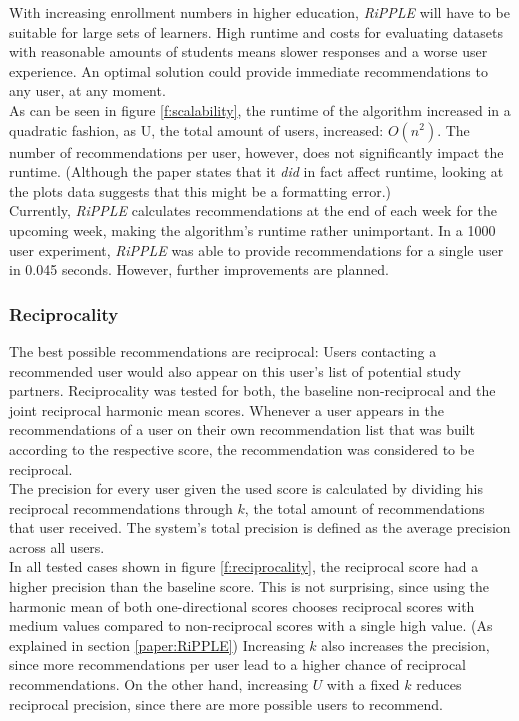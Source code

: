 \documentclass[conference]{IEEEtran}
\begin{document}
With increasing enrollment numbers in higher education, \textit{RiPPLE} will have to be suitable for large sets of learners. High runtime and costs for evaluating datasets with reasonable amounts of students means slower responses and a worse user experience. An optimal solution could provide immediate recommendations to any user, at any moment.\\
As can be seen in figure \ref{f:scalability}, the runtime of the algorithm increased in a quadratic fashion, as U, the total amount of users, increased: \(O(n^2)\). The number of recommendations per user, however, does not significantly impact the runtime. (Although the paper states that it \textit{did} in fact affect runtime, looking at the plots data suggests that this might be a formatting error.)\\
Currently, \textit{RiPPLE} calculates recommendations at the end of each week for the upcoming week, making the algorithm's runtime rather unimportant. In a 1000 user experiment, \textit{RiPPLE} was able to provide recommendations for a single user in 0.045 seconds. However, further improvements are planned.\\




\subsubsection{Reciprocality} \label{paper:reciprocality}
The best possible recommendations are reciprocal: Users contacting a recommended user would also appear on this user's list of potential study partners. \cite{prabhakar2017reciprocal} Reciprocality was tested for both, the baseline non-reciprocal and the joint reciprocal harmonic mean scores. Whenever a user appears in the recommendations of a user on their own recommendation list that was built according to the respective score, the recommendation was considered to be reciprocal.\\
The precision for every user given the used score is calculated by dividing his reciprocal recommendations through \(k\), the total amount of recommendations that user received. The system's total precision is defined as the average precision across all users. \cite{prabhakar2017reciprocal}\\ 
In all tested cases shown in figure \ref{f:reciprocality}, the reciprocal score had a higher precision than the baseline score. This is not surprising, since using the harmonic mean of both one-directional scores chooses reciprocal scores with medium values compared to non-reciprocal scores with a single high value. (As explained in section \ref{paper:RiPPLE}) Increasing \(k\) also increases the precision, since more recommendations per user lead to a higher chance of reciprocal recommendations. On the other hand, increasing \(U\) with a fixed \(k\) reduces reciprocal precision, since there are more possible users to recommend.\\
\end{document}
